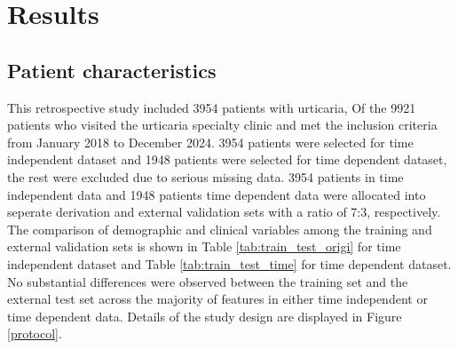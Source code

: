 \documentclass[final,1p,times,authoryear]{elsarticle}
\begin{document}
\section{Results}\label{Results}

\subsection{Patient characteristics}\label{PatientCharacteristics}

This retrospective study included 3954 patients with urticaria, 
Of the 9921 patients who visited the urticaria specialty clinic and met the inclusion criteria from January 2018 to December 2024. 3954 patients were selected for time independent dataset and 1948 patients were selected for time dependent dataset, the rest were excluded due to serious missing data. 3954 patients in time independent data and 1948 patients time dependent data were allocated into seperate derivation and external validation sets with a ratio of 7:3, respectively. The comparison of demographic and clinical variables among the training and external validation sets is shown in Table \ref{tab:train_test_origi} for time independent dataset and Table \ref{tab:train_test_time} for time dependent dataset. No substantial differences were observed between the training set and the external test set across the majority of features in either time independent or time dependent data. Details of the study design are displayed in Figure \ref{protocol}.
\end{document}
